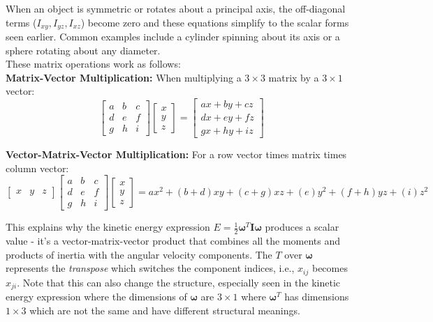 \noindent When an object is symmetric or rotates about a principal axis, the off-diagonal terms ($I_{xy}, I_{yz}, I_{xz}$) become zero and these equations simplify to the scalar forms seen earlier. Common examples include a cylinder spinning about its axis or a sphere rotating about any diameter. \\

\noindent These matrix operations work as follows: \\

\noindent \textbf{Matrix-Vector Multiplication:}  When multiplying a $3 \times 3$ matrix by a $3 \times 1$ vector:
\[
\begin{bmatrix}
a & b & c \\
d & e & f \\
g & h & i
\end{bmatrix}
\begin{bmatrix}
x \\ y \\ z
\end{bmatrix}
=
\begin{bmatrix}
ax + by + cz \\
dx + ey + fz \\
gx + hy + iz
\end{bmatrix}
\]

\noindent \textbf{Vector-Matrix-Vector Multiplication:} For a row vector times matrix times column vector:
\[
\begin{bmatrix} x & y & z \end{bmatrix}
\begin{bmatrix}
a & b & c \\
d & e & f \\
g & h & i
\end{bmatrix}
\begin{bmatrix} x \\ y \\ z \end{bmatrix}
= ax^2 + (b+d)xy + (c+g)xz + (e)y^2 + (f+h)yz + (i)z^2
\]

\noindent This explains why the kinetic energy expression $E = \frac{1}{2}\boldsymbol{\omega}^T\mathbf{I}\boldsymbol{\omega}$ produces a scalar value - it's a vector-matrix-vector product that combines all the moments and products of inertia with the angular velocity components. The $T$ over $\boldsymbol{\omega}$ represents the \textit{transpose} which switches the component indices, i.e., $x_{ij}$ becomes $x_{ji}$. Note that this can also change the structure, especially seen in the kinetic energy expression where the dimensions of $\boldsymbol{\omega}$ are $3 \times 1$ where $\boldsymbol{\omega}^T$ has dimensions $1 \times 3$ which are not the same and have different structural meanings.


